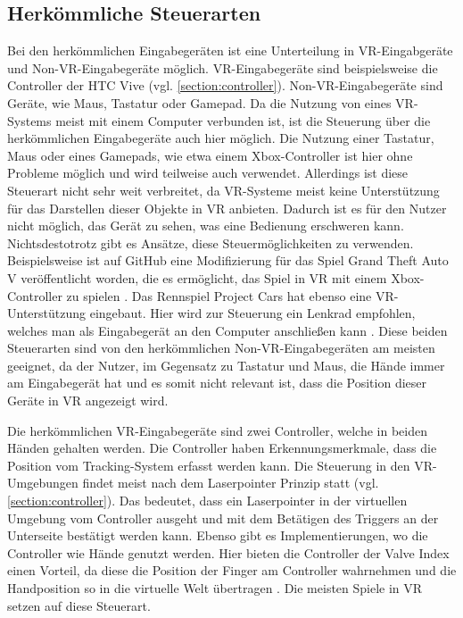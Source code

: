 \subsection{Herkömmliche Steuerarten}
Bei den herkömmlichen Eingabegeräten ist eine Unterteilung in VR-Eingabgeräte und Non-VR-Eingabegeräte möglich. VR-Eingabegeräte sind beispielsweise die Controller der HTC Vive (vgl. \autoref{section:controller}). Non-VR-Eingabegeräte sind Geräte, wie Maus, Tastatur oder Gamepad.
Da die Nutzung von eines VR-Systems meist mit einem Computer verbunden ist, ist die Steuerung über die herkömmlichen Eingabegeräte auch hier möglich. Die Nutzung einer Tastatur, Maus oder eines Gamepads, wie etwa einem Xbox-Controller ist hier ohne Probleme möglich und wird teilweise auch verwendet. Allerdings ist diese Steuerart nicht sehr weit verbreitet, da VR-Systeme meist keine Unterstützung für das Darstellen dieser Objekte in VR anbieten. Dadurch ist es für den Nutzer nicht möglich, das Gerät zu sehen, was eine Bedienung erschweren kann. Nichtsdestotrotz gibt es Ansätze, diese Steuermöglichkeiten zu verwenden. Beispielsweise ist auf GitHub eine Modifizierung für das Spiel Grand Theft Auto V veröffentlicht worden, die es ermöglicht, das Spiel in VR mit einem Xbox-Controller zu spielen \cite{Werner.2020}. Das Rennspiel Project Cars hat ebenso eine VR-Unterstützung eingebaut. Hier wird zur Steuerung ein Lenkrad empfohlen, welches man als Eingabegerät an den Computer anschließen kann \cite{projCars}. Diese beiden Steuerarten sind von den herkömmlichen Non-VR-Eingabegeräten am meisten geeignet, da der Nutzer, im Gegensatz zu Tastatur und Maus, die Hände immer am Eingabegerät hat und es somit nicht relevant ist, dass die Position dieser Geräte in VR angezeigt wird.

Die herkömmlichen VR-Eingabegeräte sind zwei Controller, welche in beiden Händen gehalten werden. Die Controller haben Erkennungsmerkmale, dass die Position vom Tracking-System erfasst werden kann. Die Steuerung in den VR-Umgebungen findet meist nach dem Laserpointer Prinzip statt (vgl. \autoref{section:controller}). Das bedeutet, dass ein Laserpointer in der virtuellen Umgebung vom Controller ausgeht und mit dem Betätigen des Triggers an der Unterseite bestätigt werden kann. Ebenso gibt es Implementierungen, wo die Controller wie Hände genutzt werden. Hier bieten die Controller der Valve Index einen Vorteil, da diese die Position der Finger am Controller wahrnehmen und die Handposition so in die virtuelle Welt übertragen \cite{Index.Controller}. Die meisten Spiele in VR setzen auf diese Steuerart.

